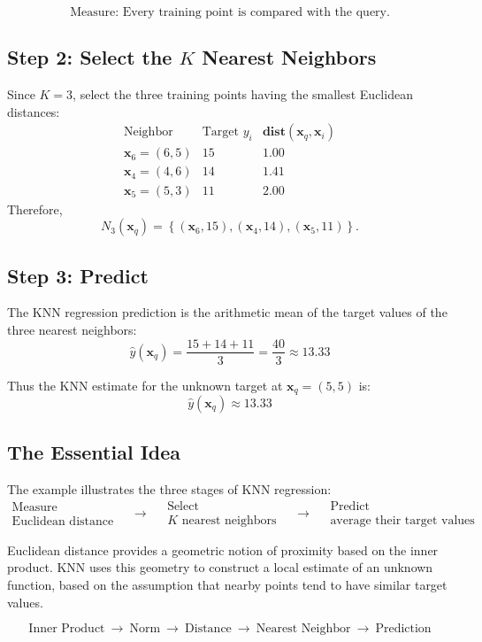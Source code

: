 \documentclass[12pt]{article}
\newcommand{\MVec}[1]{\mathbf{#1}}
\begin{document}
\[
    \boxed{
        \text{Measure: Every training point is compared with the query.}
    }
\]

\subsection*{Step 2: Select the $K$ Nearest Neighbors}
Since $K=3$, select the three training points having the smallest Euclidean distances:
\[
    \begin{array}{c|c|c}
        \text{Neighbor} & \text{Target } y_i & \mathbf{dist}(\MVec{x}_q,\MVec{x}_i) \\ \hline
        \MVec{x}_6=(6,5) & 15 & 1.00 \\
        \MVec{x}_4=(4,6) & 14 & 1.41 \\
        \MVec{x}_5=(5,3) & 11 & 2.00
    \end{array}
\]
Therefore,
\[
    N_3(\MVec{x}_q) =
    \left\{
        (\MVec{x}_6,15),
        (\MVec{x}_4,14),
        (\MVec{x}_5,11)
    \right\}.
\]

\subsection*{Step 3: Predict}
The KNN regression prediction is the arithmetic mean of the target values of the three nearest neighbors:
\[
    \hat{y}(\MVec{x}_q) = \frac{15+14+11}{3} = \frac{40}{3} \approx 13.33
\]

Thus the KNN estimate for the unknown target at $\MVec{x}_q=(5,5)$ is:
\[
    \boxed{
        \hat{y}(\MVec{x}_q) \approx 13.33
    }
\]

\subsection*{The Essential Idea}
The example illustrates the three stages of KNN regression:
\[
    \boxed{
        \begin{array}{c}
            \text{Measure}\\
            \text{Euclidean distance}
        \end{array}
    }
    \quad
    \longrightarrow
    \quad
    \boxed{
        \begin{array}{c}
            \text{Select}\\
            K\text{ nearest neighbors}
        \end{array}
    }
    \quad
    \longrightarrow
    \quad
    \boxed{
    \begin{array}{c}
        \text{Predict}\\
        \text{average their target values}
    \end{array}
    }
\]

Euclidean distance provides a geometric notion of proximity
based on the inner product. KNN uses this geometry to construct a
local estimate of an unknown function, based on the assumption
that nearby points tend to have similar target values.

\[
    \boxed{\text{Inner Product}}
    \
    \longrightarrow
    \
    \boxed{\text{Norm}}
    \
    \longrightarrow
    \
    \boxed{\text{Distance}}
    \
    \longrightarrow
    \
    \boxed{\text{Nearest Neighbor}}
    \
    \longrightarrow
    \
    \boxed{\text{Prediction}}
\]
\end{document}
